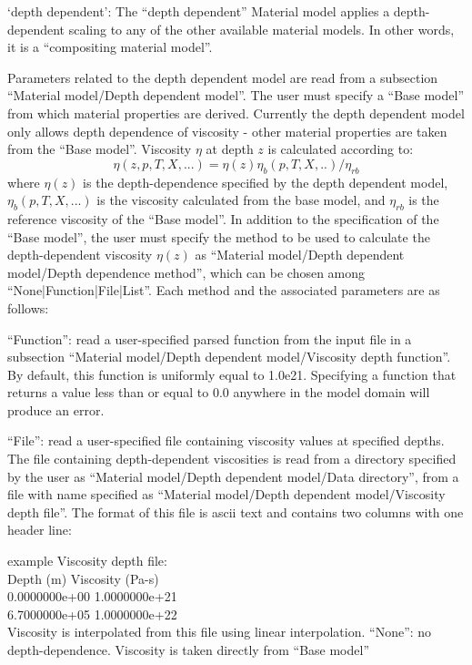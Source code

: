\begin{itemize}
`depth dependent': The ``depth dependent'' Material model applies a depth-dependent scaling to any of the other available material models. In other words, it is a ``compositing material model''.

Parameters related to the depth dependent model are read from a subsection ``Material model/Depth dependent model''. The user must specify a ``Base model'' from which material properties are derived. Currently the depth dependent model only allows depth dependence of viscosity - other material properties are taken from the ``Base model''. Viscosity $\eta$ at depth $z$ is calculated according to:\begin{equation}\eta(z,p,T,X,...) = \eta(z) \eta_b(p,T,X,..)/\eta_{rb}\end{equation}where $\eta(z)$ is the depth-dependence specified by the depth dependent model, $\eta_b(p,T,X,...)$ is the viscosity calculated from the base model, and $\eta_{rb}$ is the reference viscosity of the ``Base model''. In addition to the specification of the ``Base model'', the user must specify the method to be used to calculate the depth-dependent viscosity $\eta(z)$ as ``Material model/Depth dependent model/Depth dependence method'', which can be chosen among ``None|Function|File|List''. Each method and the associated parameters are as follows:

``Function'': read a user-specified parsed function from the input file in a subsection ``Material model/Depth dependent model/Viscosity depth function''. By default, this function is uniformly equal to 1.0e21. Specifying a function that returns a value less than or equal to 0.0 anywhere in the model domain will produce an error. 

``File'': read a user-specified file containing viscosity values at specified depths. The file containing depth-dependent viscosities is read from a directory specified by the user as ``Material model/Depth dependent model/Data directory'', from a file with name specified as ``Material model/Depth dependent model/Viscosity depth file''. The format of this file is ascii text and contains two columns with one header line:

example Viscosity depth file:\\Depth (m)    Viscosity (Pa-s)\\0.0000000e+00     1.0000000e+21\\6.7000000e+05     1.0000000e+22\\

Viscosity is interpolated from this file using linear interpolation. ``None'': no depth-dependence. Viscosity is taken directly from ``Base model''


\end{itemize}
